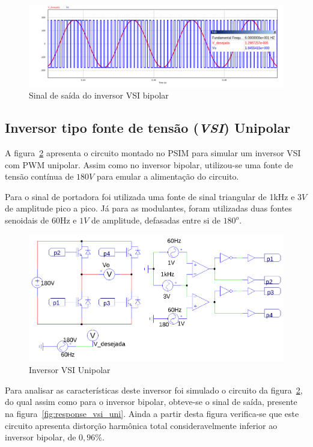 \documentclass[
	12pt,				%
	openany,
	onseside,
	a4paper,			%
	english,			%
	french,				%
	spanish,			%
	brazil,				%
	]{abntex2}
\begin{document}
\begin{figure}[htbp]%
	\centering
		\includegraphics[width= \linewidth]{vsi_bip_out}
		\caption{Sinal de saída do inversor VSI bipolar}
		\label{fig:response_vsi_bip}
\end{figure}

\subsection{Inversor tipo fonte de tensão (\textit{VSI}) Unipolar}

A figura~\ref{fig:VSI_uni_circ} apresenta o circuito montado no PSIM para simular um inversor VSI com PWM unipolar. Assim como no inversor bipolar, utilizou-se uma fonte de tensão contínua de $180V$ para emular a alimentação do circuito.

Para o sinal de portadora foi utilizada uma fonte de sinal triangular de 1kHz e $3V$ de amplitude pico a pico. Já para as modulantes, foram utilizadas duas fontes senoidais de 60Hz e $1V$ de amplitude, defasadas entre si de $180^o$.

\begin{figure}[H]%
	\centering%
		\includegraphics[width=0.85 \linewidth]{vsi_unipolar_psim_circ}
		\caption{Inversor VSI Unipolar}
		\label{fig:VSI_uni_circ}
\end{figure}

Para analisar as características deste inversor foi simulado o circuito da figura~\ref{fig:VSI_uni_circ}, do qual assim como para o inversor bipolar, obteve-se o sinal de saída, presente na figura~\ref{fig:response_vsi_uni}. Ainda a partir desta figura verifica-se que este circuito apresenta distorção harmônica total consideravelmente inferior ao inversor bipolar, de $0,96\%$.
\end{document}
